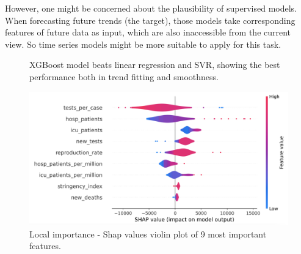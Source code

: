 \documentclass[11pt]{article}
\begin{document}
However, one might be concerned about the plausibility of supervised models. When forecasting future trends (the target), those models take corresponding features of future data as input, which are also inaccessible from the current view. So time series models might be more suitable to apply for this task.
\begin{figure}[!htb]
	\centering
	\vspace{-0.3in}
	\vspace{-0.3in}
	\vspace{-0.1in}
	\caption{XGBoost model beats linear regression and SVR, showing the best performance both in trend fitting and smoothness.}
\end{figure}

 \begin{figure}[!htb]
	\setlength{\abovecaptionskip}{0.cm}
	\centering
	\includegraphics[width=0.6\linewidth]{../figures/shap.png} 
	\caption{Local importance - Shap values violin plot of 9 most important features.} 
\end{figure}
\end{document}
